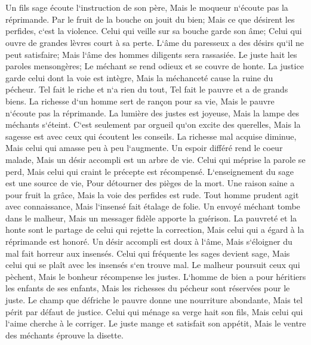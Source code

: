 \chapter{}

\verse Un fils sage écoute l`instruction de son père, Mais le moqueur n`écoute pas la réprimande. 
\verse Par le fruit de la bouche on jouit du bien; Mais ce que désirent les perfides, c`est la violence. 
\verse Celui qui veille sur sa bouche garde son âme; Celui qui ouvre de grandes lèvres court à sa perte. 
\verse L`âme du paresseux a des désirs qu`il ne peut satisfaire; Mais l`âme des hommes diligents sera rassasiée. 
\verse Le juste hait les paroles mensongères; Le méchant se rend odieux et se couvre de honte. 
\verse La justice garde celui dont la voie est intègre, Mais la méchanceté cause la ruine du pécheur. 
\verse Tel fait le riche et n`a rien du tout, Tel fait le pauvre et a de grands biens. 
\verse La richesse d`un homme sert de rançon pour sa vie, Mais le pauvre n`écoute pas la réprimande. 
\verse La lumière des justes est joyeuse, Mais la lampe des méchants s`éteint. 
\verse C`est seulement par orgueil qu`on excite des querelles, Mais la sagesse est avec ceux qui écoutent les conseils. 
\verse La richesse mal acquise diminue, Mais celui qui amasse peu à peu l`augmente. 
\verse Un espoir différé rend le coeur malade, Mais un désir accompli est un arbre de vie. 
\verse Celui qui méprise la parole se perd, Mais celui qui craint le précepte est récompensé. 
\verse L`enseignement du sage est une source de vie, Pour détourner des pièges de la mort. 
\verse Une raison saine a pour fruit la grâce, Mais la voie des perfides est rude. 
\verse Tout homme prudent agit avec connaissance, Mais l`insensé fait étalage de folie. 
\verse Un envoyé méchant tombe dans le malheur, Mais un messager fidèle apporte la guérison. 
\verse La pauvreté et la honte sont le partage de celui qui rejette la correction, Mais celui qui a égard à la réprimande est honoré. 
\verse Un désir accompli est doux à l`âme, Mais s`éloigner du mal fait horreur aux insensés. 
\verse Celui qui fréquente les sages devient sage, Mais celui qui se plaît avec les insensés s`en trouve mal. 
\verse Le malheur poursuit ceux qui pèchent, Mais le bonheur récompense les justes. 
\verse L`homme de bien a pour héritiers les enfants de ses enfants, Mais les richesses du pécheur sont réservées pour le juste. 
\verse Le champ que défriche le pauvre donne une nourriture abondante, Mais tel périt par défaut de justice. 
\verse Celui qui ménage sa verge hait son fils, Mais celui qui l`aime cherche à le corriger. 
\verse Le juste mange et satisfait son appétit, Mais le ventre des méchants éprouve la disette. 


